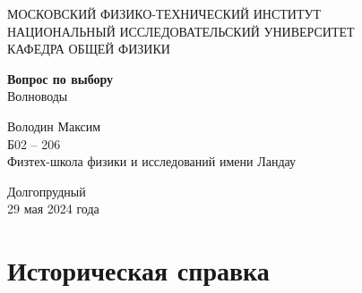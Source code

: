 \documentclass[a4paper, 14pt]{article}
\begin{document}
    \begin{titlepage}
        \begin{center}
        {\large МОСКОВСКИЙ ФИЗИКО-ТЕХНИЧЕСКИЙ ИНСТИТУТ \\ \vspace{5mm}
        НАЦИОНАЛЬНЫЙ ИССЛЕДОВАТЕЛЬСКИЙ УНИВЕРСИТЕТ \\ \vspace{5mm}
        КАФЕДРА ОБЩЕЙ ФИЗИКИ}
        \end{center}
        
        \begin{center}
        {\large}
        \end{center}
        
        \vspace{5cm}
        
        {\huge
            \begin{center}
            {\textbf{Вопрос по выбору}}
                \\
                Волноводы
            \end{center}
        }
        
        \vspace{2cm}
        
        \begin{flushright}
        {
            Володин Максим \\
            \vspace{2mm}
            Б02 -- 206 \\
            \vspace{2mm}
            Физтех-школа физики и исследований имени Ландау
        }
        \end{flushright}
        
        \tableofcontents \vspace{2.5cm}
        
        \begin{center}
            Долгопрудный \\
            29 мая 2024 года
        \end{center}
    
    \end{titlepage}
    
    \section*{Историческая справка} 
    
\end{document}
